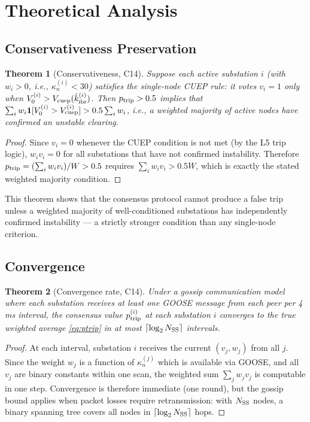 \documentclass[journal]{IEEEtran}
\newcommand{\kappan}{\kappa_{n}}
\newcommand{\ptrip}{p_{\rm trip}}
\newcommand{\NSS}{N_{\rm SS}}
\newcommand{\hatkibr}{\hat{k}_{\rm ibr}}
\newtheorem{theorem}{Theorem}
\begin{document}
\section{Theoretical Analysis}
\label{sec:theory}

\subsection{Conservativeness Preservation}

\begin{theorem}[Conservativeness, C14]
\label{thm:conservativeness}
Suppose each active substation $i$ (with $w_i > 0$, i.e.,
$\kappan^{(i)} < 30$) satisfies the single-node CUEP rule: it votes
$v_i = 1$ only when $V_0^{(i)} > V_{\rm cuep}(\hatkibr^{(i)})$.
Then $\ptrip > 0.5$ implies that $\sum_i w_i \mathbf{1}[V_0^{(i)}
> V_{\rm cuep}^{(i)}] > 0.5 \sum_i w_i$, i.e., a weighted majority
of active nodes have confirmed an unstable clearing.
\end{theorem}

\begin{proof}
Since $v_i = 0$ whenever the CUEP condition is not met (by the L5
trip logic), $w_i v_i = 0$ for all substations that have not
confirmed instability.  Therefore $\ptrip = (\sum_i w_i v_i)/W
> 0.5$ requires $\sum_i w_i v_i > 0.5 W$, which is exactly the
stated weighted majority condition.
\end{proof}

This theorem shows that the consensus protocol cannot produce a
false trip unless a weighted majority of well-conditioned substations
has independently confirmed instability — a strictly stronger
condition than any single-node criterion.

\subsection{Convergence}

\begin{theorem}[Convergence rate, C14]
\label{thm:convergence}
Under a gossip communication model where each substation receives
at least one GOOSE message from each peer per 4\,ms interval, the
consensus value $\ptrip^{(i)}$ at each substation $i$ converges to
the true weighted average \eqref{eq:ptrip} in at most
$\lceil \log_2 \NSS \rceil$ intervals.
\end{theorem}

\begin{proof}
At each interval, substation $i$ receives the current $(v_j, w_j)$
from all $j$.  Since the weight $w_j$ is a function of $\kappan^{(j)}$
which is available via GOOSE, and all $v_j$ are binary constants
within one scan, the weighted sum $\sum_j w_j v_j$ is computable in
one step.  Convergence is therefore immediate (one round), but the
gossip bound applies when packet losses require retransmission:
with $\NSS$ nodes, a binary spanning tree covers all nodes in
$\lceil \log_2 \NSS \rceil$ hops.
\end{proof}
\end{document}
